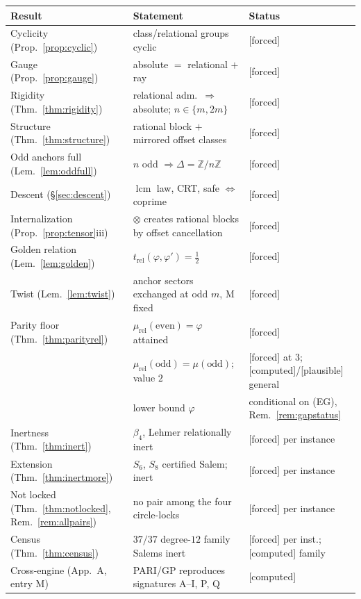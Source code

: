 \documentclass[11pt]{article}
\theoremstyle{plain}
\theoremstyle{definition}
\theoremstyle{remark}
\newcommand{\Z}{\mathbb{Z}}
\newcommand{\Mah}{\mathrm{M}}
\DeclareMathOperator{\lcm}{lcm}
\newcommand{\F}{\textnormal{[forced]}}
\newcommand{\C}{\textnormal{[computed]}}
\newcommand{\Pl}{\textnormal{[plausible]}}
\begin{document}
\begin{center}
\small
\begin{tabular}{p{4.9cm}p{5.6cm}p{3.6cm}}
\hline
Result & Statement & Status\\
\hline
Cyclicity (Prop.~\ref{prop:cyclic}) & class/relational groups cyclic & \F\\
Gauge (Prop.~\ref{prop:gauge}) & absolute $=$ relational $+$ ray & \F\\
Rigidity (Thm.~\ref{thm:rigidity}) & relational adm.\ $\Rightarrow$ absolute; $n\in\{m,2m\}$ & \F\\
Structure (Thm.~\ref{thm:structure}) & rational block $+$ mirrored offset classes & \F\\
Odd anchors full (Lem.~\ref{lem:oddfull}) & $n$ odd $\Rightarrow\Delta=\Z/n\Z$ & \F\\
Descent (\S\ref{sec:descent}) & $\lcm$ law, CRT, safe $\Leftrightarrow$ coprime & \F\\
Internalization (Prop.~\ref{prop:tensor}iii) & $\otimes$ creates rational blocks by offset cancellation & \F\\
Golden relation (Lem.~\ref{lem:golden}) & $t_{\mathrm{rel}}(\varphi,\varphi')=\tfrac12$ & \F\\
Twist (Lem.~\ref{lem:twist}) & anchor sectors exchanged at odd $m$, $\Mah$ fixed & \F\\
Parity floor (Thm.~\ref{thm:parityrel}) & $\mu_{\mathrm{rel}}(\text{even})=\varphi$ attained & \F\\
 & $\mu_{\mathrm{rel}}(\text{odd})=\mu(\text{odd})$; value $2$ & \F{} at $3$; \C/\Pl{} general\\
 & lower bound $\varphi$ & conditional on (EG), Rem.~\ref{rem:gapstatus}\\
Inertness (Thm.~\ref{thm:inert}) & $\beta_4$, Lehmer relationally inert & \F{} per instance\\
Extension (Thm.~\ref{thm:inertmore}) & $S_6$, $S_8$ certified Salem; inert & \F{} per instance\\
Not locked (Thm.~\ref{thm:notlocked}, Rem.~\ref{rem:allpairs}) & no pair among the four circle-locks & \F{} per instance\\
Census (Thm.~\ref{thm:census}) & $37/37$ degree-$12$ family Salems inert & \F{} per inst.; \C{} family\\
Cross-engine (App.~A, entry M) & PARI/GP reproduces signatures A--I, P, Q & \C\\
\hline
\end{tabular}
\end{center}
\end{document}
